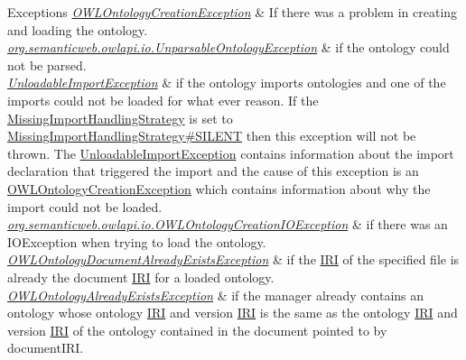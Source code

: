\begin{DoxyExceptions}{Exceptions}
{\em \hyperlink{classorg_1_1semanticweb_1_1owlapi_1_1model_1_1_o_w_l_ontology_creation_exception}{O\-W\-L\-Ontology\-Creation\-Exception}} & If there was a problem in creating and loading the ontology. \\
\hline
{\em \hyperlink{classorg_1_1semanticweb_1_1owlapi_1_1io_1_1_unparsable_ontology_exception}{org.\-semanticweb.\-owlapi.\-io.\-Unparsable\-Ontology\-Exception}} & if the ontology could not be parsed. \\
\hline
{\em \hyperlink{classorg_1_1semanticweb_1_1owlapi_1_1model_1_1_unloadable_import_exception}{Unloadable\-Import\-Exception}} & if the ontology imports ontologies and one of the imports could not be loaded for what ever reason. If the \hyperlink{enumorg_1_1semanticweb_1_1owlapi_1_1model_1_1_missing_import_handling_strategy}{Missing\-Import\-Handling\-Strategy} is set to \hyperlink{enumorg_1_1semanticweb_1_1owlapi_1_1model_1_1_missing_import_handling_strategy_aed66060ec95dc4ad59ca4dd82509782b}{Missing\-Import\-Handling\-Strategy\#\-S\-I\-L\-E\-N\-T} then this exception will not be thrown. The {\ttfamily \hyperlink{classorg_1_1semanticweb_1_1owlapi_1_1model_1_1_unloadable_import_exception}{Unloadable\-Import\-Exception}} contains information about the import declaration that triggered the import and the cause of this exception is an {\ttfamily \hyperlink{classorg_1_1semanticweb_1_1owlapi_1_1model_1_1_o_w_l_ontology_creation_exception}{O\-W\-L\-Ontology\-Creation\-Exception}} which contains information about why the import could not be loaded. \\
\hline
{\em \hyperlink{classorg_1_1semanticweb_1_1owlapi_1_1io_1_1_o_w_l_ontology_creation_i_o_exception}{org.\-semanticweb.\-owlapi.\-io.\-O\-W\-L\-Ontology\-Creation\-I\-O\-Exception}} & if there was an {\ttfamily I\-O\-Exception} when trying to load the ontology. \\
\hline
{\em \hyperlink{classorg_1_1semanticweb_1_1owlapi_1_1model_1_1_o_w_l_ontology_document_already_exists_exception}{O\-W\-L\-Ontology\-Document\-Already\-Exists\-Exception}} & if the \hyperlink{classorg_1_1semanticweb_1_1owlapi_1_1model_1_1_i_r_i}{I\-R\-I} of the specified file is already the document \hyperlink{classorg_1_1semanticweb_1_1owlapi_1_1model_1_1_i_r_i}{I\-R\-I} for a loaded ontology. \\
\hline
{\em \hyperlink{classorg_1_1semanticweb_1_1owlapi_1_1model_1_1_o_w_l_ontology_already_exists_exception}{O\-W\-L\-Ontology\-Already\-Exists\-Exception}} & if the manager already contains an ontology whose ontology \hyperlink{classorg_1_1semanticweb_1_1owlapi_1_1model_1_1_i_r_i}{I\-R\-I} and version \hyperlink{classorg_1_1semanticweb_1_1owlapi_1_1model_1_1_i_r_i}{I\-R\-I} is the same as the ontology \hyperlink{classorg_1_1semanticweb_1_1owlapi_1_1model_1_1_i_r_i}{I\-R\-I} and version \hyperlink{classorg_1_1semanticweb_1_1owlapi_1_1model_1_1_i_r_i}{I\-R\-I} of the ontology contained in the document pointed to by {\ttfamily document\-I\-R\-I}. \\
\hline
\end{DoxyExceptions}



